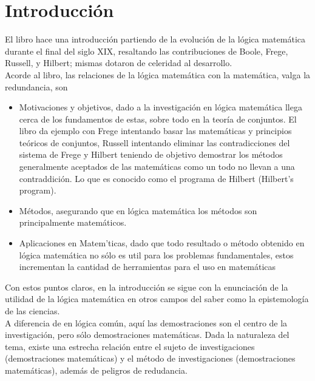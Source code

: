 \chapter*{Introducci\'on}
El libro hace una introducci\'on partiendo de la evoluci\'on de la l\'ogica matem\'atica durante el final del siglo XIX, resaltando las contribuciones de Boole, Frege, Russell, y Hilbert; mismas dotaron de celeridad al desarrollo. \\
Acorde al libro, las relaciones de la l\'ogica matem\'atica con la matem\'atica, valga la redundancia, son 
\begin{itemize}
\item Motivaciones y objetivos, dado a la investigaci\'on en l\'ogica matem\'atica llega cerca de los fundamentos de estas, sobre todo en la teor\'ia de conjuntos. El libro da ejemplo con Frege intentando basar las matem\'aticas y principios te\'oricos de conjuntos, Russell intentando eliminar las contradicciones del sistema de Frege y Hilbert teniendo de objetivo demostrar los m\'etodos generalmente aceptados de las matem\'aticas como un todo no llevan a una contraddici\'on. Lo que es conocido como el programa de Hilbert (Hilbert's program). 
\item M\'etodos, asegurando que en l\'ogica matem\'atica los m\'etodos son principalmente matem\'aticos.
\item Aplicaciones en Matem\a'ticas, dado que todo resultado o m\'etodo obtenido en l\'ogica matem\'atica no s\'olo es util para los problemas fundamentales, estos incrementan la cantidad de herramientas para el uso en matem\'aticas
\end{itemize}

Con estos puntos claros, en la introducci\'on se sigue con la enunciaci\'on de la utilidad de la l\'ogica matem\'atica en otros campos del saber como la epistemolog\'ia de las ciencias.\\
 A diferencia de en l\'ogica com\'un, aqu\'i las demostraciones son el centro de la investigaci\'on, pero s\'olo demostraciones matem\'aticas. Dada la naturaleza del tema, existe una estrecha relaci\'on entre el sujeto de investigaciones (demostraciones matem\'aticas) y el m\'etodo de investigaciones (demostraciones matem\'aticas), adem\'as de peligros de redudancia.\\

